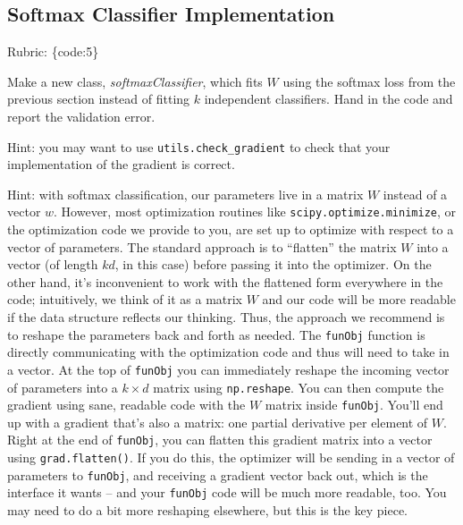 \documentclass{article}
\def\rubric#1{\gre{Rubric: \{#1\}}}{}
\def\blu#1{{\color{blu}#1}}
\def\gre#1{{\color{gre}#1}}
\begin{document}
\subsection{Softmax Classifier Implementation}
\rubric{code:5}

Make a new class, \emph{softmaxClassifier}, which fits $W$ using the softmax loss from the previous section instead of fitting $k$ independent classifiers. \blu{Hand in the code and report the validation error}.

Hint: you may want to use \verb|utils.check_gradient| to check that your implementation of the gradient is correct.

Hint: with softmax classification, our parameters live in a matrix $W$ instead of a vector $w$. However, most optimization routines like \texttt{scipy.optimize.minimize}, or the optimization code we provide to you, are set up to optimize with respect to a vector of parameters. The standard approach is to ``flatten'' the matrix $W$ into a vector (of length $kd$, in this case) before passing it into the optimizer. On the other hand, it's inconvenient to work with the flattened form everywhere in the code; intuitively, we think of it as a matrix $W$ and our code will be more readable if the data structure reflects our thinking. Thus, the approach we recommend is to reshape the parameters back and forth as needed. The \texttt{funObj} function is directly communicating with the optimization code and thus will need to take in a vector. At the top of \texttt{funObj} you can immediately reshape the incoming vector of parameters into a $k \times d$ matrix using \texttt{np.reshape}. You can then compute the gradient using sane, readable code with the $W$ matrix inside \texttt{funObj}. You'll end up with a gradient that's also a matrix: one partial derivative per element of $W$. Right at the end of \texttt{funObj}, you can flatten this gradient matrix into a vector using \texttt{grad.flatten()}. If you do this, the optimizer will be sending in a vector of parameters to \texttt{funObj}, and receiving a gradient vector back out, which is the interface it wants -- and your \texttt{funObj} code will be much more readable, too. You may need to do a bit more reshaping elsewhere, but this is the key piece.
\end{document}
